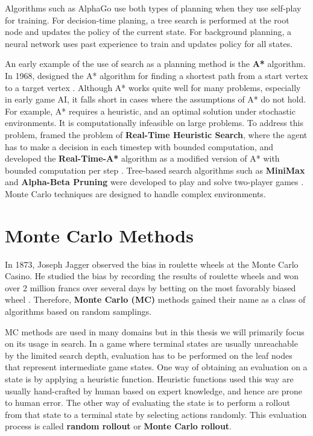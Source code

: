 Algorithms such as AlphaGo use both types of planning when they use self-play for training.
For decision-time planing, a tree search is performed at the root node and updates the policy of the current state.
For background planning, a neural network uses past experience to train and updates policy for all states.

An early example of the use of search as a planning method is the \textbf{A*} algorithm.
In 1968, \citeauthor{FormalBasisHeuristic_Hart.Nilsson.ea_1968} designed the A* algorithm for finding a shortest path from a start vertex to a target vertex \cite{FormalBasisHeuristic_Hart.Nilsson.ea_1968}.
Although A* works quite well for many problems, especially in early game AI, it falls short in cases where the assumptions of A* do not hold.
For example, A* requires a heuristic, and an optimal solution under stochastic environments.
It is computationally infeasible on large problems.
To address this problem, \citeauthor{RealtimeHeuristicSearch_Korf_1990} framed the problem of \textbf{Real-Time Heuristic Search},
where the agent has to make a decision in each timestep with bounded computation, and developed the \textbf{Real-Time-A*} algorithm as a modified version of A* with bounded computation per step \cite{RealtimeHeuristicSearch_Korf_1990}.
Tree-based search algorithms such as \textbf{MiniMax} and \textbf{Alpha-Beta Pruning} were developed to play and solve two-player games \cite{AnalysisAlphabetaPruning_Knuth.Moore_1975}.
Monte Carlo techniques are designed to handle complex environments.

\section{Monte Carlo Methods}
In 1873, Joseph Jagger observed the bias in roulette wheels at the Monte Carlo Casino.
He studied the bias by recording the results of roulette wheels and won over 2 million francs over several days by betting on the most favorably biased wheel \cite{MonteCarloCasino__2022}.
Therefore, \textbf{Monte Carlo (MC)} methods gained their name as a class of algorithms based on random samplings.

MC methods are used in many domains but in this thesis we will primarily focus on its usage in search.
In a game where terminal states are usually unreachable by the limited search depth, evaluation has to be performed on the leaf nodes that represent intermediate game states.
One way of obtaining an evaluation on a state is by applying a heuristic function.
Heuristic functions used this way are usually hand-crafted by human based on expert knowledge, and hence are prone to human error.
The other way of evaluating the state is to perform a rollout from that state to a terminal state by selecting actions randomly.
This evaluation process is called \textbf{random rollout} or \textbf{Monte Carlo rollout}.

